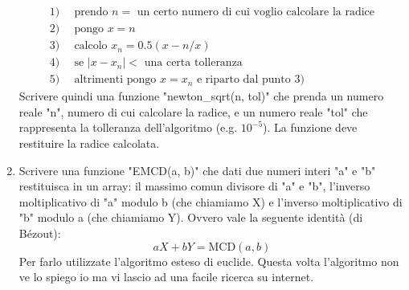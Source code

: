 \documentclass[10pt,a4paper]{article}
\begin{document}
\begin{enumerate}
\[
\begin{split}
1)& \, \text{ prendo } n = \text{ un certo numero di cui voglio calcolare la radice} \\
2)& \, \text{ pongo } x = n \\
3)& \, \text{ calcolo } x_n = 0.5 (x - n/x) \\
4)& \, \text{ se } | x - x_n | < \text{ una certa tolleranza } \\
5)& \, \text{ altrimenti pongo } x = x_n \text{ e riparto dal punto 3)}
\end{split}
\]
Scrivere quindi una funzione "newton\_sqrt(n, tol)" che prenda un numero reale "n", numero di cui calcolare la radice, e un numero reale "tol" che rappresenta la tolleranza dell'algoritmo (e.g. $10^{-5}$). La funzione deve restituire la radice calcolata.
\item Scrivere una funzione "EMCD(a, b)" che dati due numeri interi "a" e "b" restituisca in un array: il massimo comun divisore di "a" e "b", l'inverso moltiplicativo di "a" modulo b (che chiamiamo X) e l'inverso moltiplicativo di "b" modulo a (che chiamiamo Y). Ovvero vale la seguente identità (di Bézout):
\[
a X + b Y = \text{MCD}(a, b) 
\]
Per farlo utilizzate l'algoritmo esteso di euclide. Questa volta l'algoritmo non ve lo spiego io ma vi lascio ad una facile ricerca su internet.
\end{enumerate}
\end{document}
